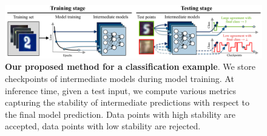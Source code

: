 
\begin{figure}[t]
    \centering
    \includegraphics[width=0.97\linewidth]{figs/sptd/nntd.pdf}
    \caption[Our proposed \sptd method for a classification example]{\textbf{Our proposed \sptd method for a classification example}. We store checkpoints of intermediate models during model training. At inference time, given a test input, we compute various metrics capturing the stability of intermediate predictions with respect to the final model prediction. Data points with high stability are accepted, data points with low stability are rejected.}
    \label{fig:nntd_overview}
\end{figure}






